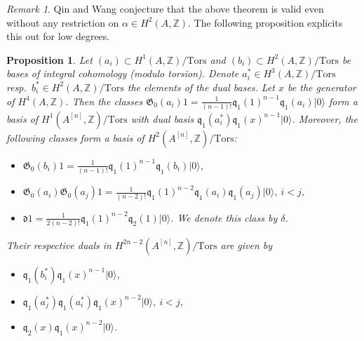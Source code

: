 \documentclass{amsart}
\newcommand{\hilb}[1]{^{[#1]}}
\newcommand{\vac}{|0\rangle}
\newcommand{\G}{\mathfrak{G}}
\newcommand{\q}{\mathfrak{q}}
\newcommand{\Z}{\mathbb{Z}}
\theoremstyle{plain}
\newtheorem{proposition}[theorem]{Proposition}
\theoremstyle{definition}
\theoremstyle{remark}
\newtheorem{remark}[theorem]{Remark}
\begin{document}
\begin{remark}
Qin and Wang \cite{QinWang} conjecture that the above theorem is valid even without any restriction on $\alpha \in H^2(A,\Z)$. The following proposition explicits this out for low degrees.
\end{remark}
\begin{proposition}
Let $(a_i) \subset H^1(A,\Z)/\text{Tors}$ and $(b_i)\subset H^2(A,\Z)/\text{Tors}$ be bases of integral cohomology (modulo torsion). Denote $a_i^*\in H^3(A,\Z)/\text{Tors}$ resp.~$b_i^*\in H^2(A,\Z)/\text{Tors}$ the elements of the dual bases. Let $x$ be the generator of $H^4(A,\Z)$. Then the classes
$\G_0(a_i)1 = \frac{1}{(n-1)!}\q_{1}(1)^{n-1}\q_{1}(a_{i})\vac$ form a basis of $H^1(A\hilb{n},\Z)/\text{Tors}$ with dual basis
$\q_1(a_i^*)\q_1(x)^{n-1}\vac$.
Moreover, the following classes form a basis of $H^2(A\hilb{n},\Z)/\text{Tors}$:
\begin{itemize}
 \item $\G_0(b_i)1=\frac{1}{(n-1)!}\q_{1}(1)^{n-1}\q_{1}(b_{i})\vac$,
 \item $\G_0(a_i)\G_0(a_j)1 = \frac{1}{(n-2)!}\q_{1}(1)^{n-2}\q_{1}(a_{i})\q_{1}(a_{j})\vac,\  i < j$,
 \item $\mathfrak{d} 1 =  \frac{1}{2(n-2)!}\q_{1}(1)^{n-2}\q_{2}(1) \vac$. We denote this class by $\delta$.
\end{itemize}
Their respective duals in $H^{2n-2}(A\hilb{n},\Z)/\text{Tors}$ are given by
\begin{itemize}
 \item $\q_{1}(b_{i}^*)\q_{1}(x)^{n-1}\vac$,
 \item $\q_{1}(a_{j}^*)\q_{1}(a_{i}^*)\q_{1}(x)^{n-2}\vac,\  i < j$,
 \item $\q_2(x)\q_{1}(x)^{n-2} \vac$.
\end{itemize}
\end{proposition}
\end{document}
